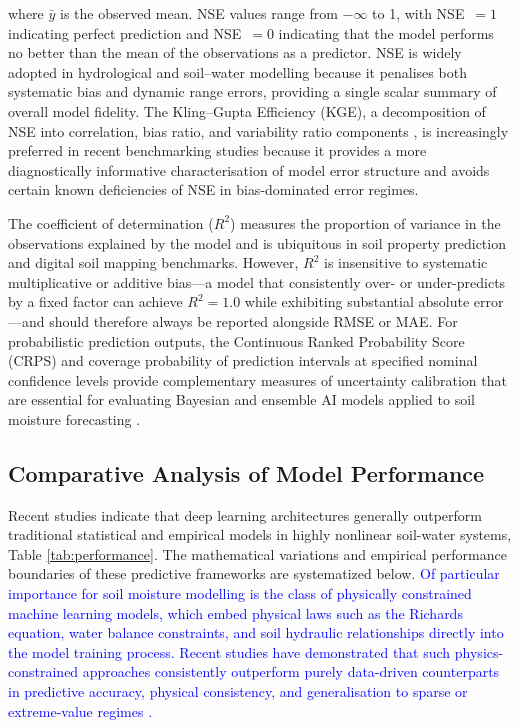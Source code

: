 \documentclass[land,article,submit,pdftex,moreauthors]{Definitions/mdpi}
\numberwithin{equation}{section}
\begin{document}
where $\bar{y}$ is the observed mean. NSE values range from $-\infty$ to 1, with NSE~$= 1$ indicating perfect prediction and NSE~$= 0$ indicating that the model performs no better than the mean of the observations as a predictor. NSE is widely adopted in hydrological and soil--water modelling because it penalises both systematic bias and dynamic range errors, providing a single scalar summary of overall model fidelity. The Kling--Gupta Efficiency (KGE), a decomposition of NSE into correlation, bias ratio, and variability ratio components \citep{gupta2009decomposition}, is increasingly preferred in recent benchmarking studies because it provides a more diagnostically informative characterisation of model error structure and avoids certain known deficiencies of NSE in bias-dominated error regimes.

The coefficient of determination ($R^2$) measures the proportion of variance in the observations explained by the model and is ubiquitous in soil property prediction and digital soil mapping benchmarks. However, $R^2$ is insensitive to systematic multiplicative or additive bias---a model that consistently over- or under-predicts by a fixed factor can achieve $R^2 = 1.0$ while exhibiting substantial absolute error---and should therefore always be reported alongside RMSE or MAE. For probabilistic prediction outputs, the Continuous Ranked Probability Score (CRPS) and coverage probability of prediction intervals at specified nominal confidence levels provide complementary measures of uncertainty calibration that are essential for evaluating Bayesian and ensemble AI models applied to soil moisture forecasting \citep{gneiting2007strictly}.

\subsection{Comparative Analysis of Model Performance}
Recent studies indicate that deep learning architectures generally outperform traditional statistical and empirical models in highly nonlinear soil-water systems, Table \ref{tab:performance}. The mathematical variations and empirical performance boundaries of these predictive frameworks are systematized below. \textcolor{blue}{Of particular importance for soil moisture modelling is the class of physically constrained machine learning models, which embed physical laws such as the Richards equation, water balance constraints, and soil hydraulic relationships directly into the model training process. Recent studies have demonstrated that such physics-constrained approaches consistently outperform purely data-driven counterparts in predictive accuracy, physical consistency, and generalisation to sparse or extreme-value regimes \citep{ghorbani2021physics, Wang2023WR035194, Alsumaiei70551}.}
\end{document}
